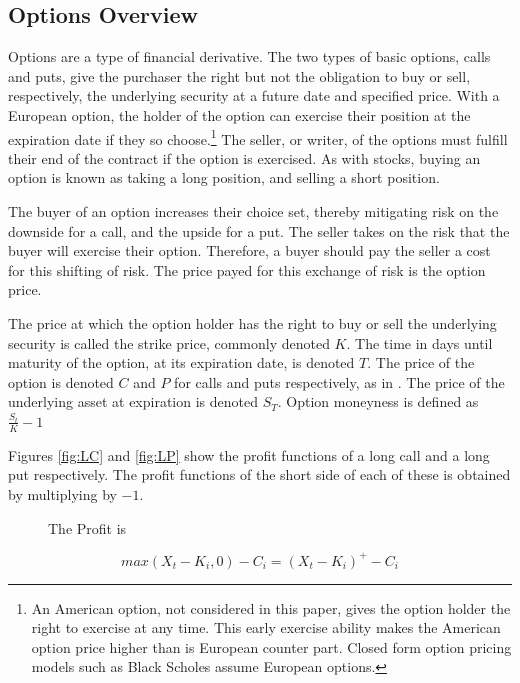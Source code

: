 \begin{appendix}
\section{Options Overview}\label{app:Options}

Options are a type of financial derivative. The two types of basic options, calls and puts, give the purchaser the right but not the obligation to buy or sell, respectively, the underlying security at a future date and specified price. With a European option, the holder of the option can exercise their position at the expiration date if they so choose.\footnote{An American option, not considered in this paper, gives the option holder the right to exercise at any time. This early exercise ability makes the American option price higher than is European counter part. Closed form option pricing models such as Black Scholes assume European options.} The seller, or writer, of the options must fulfill their end of the contract if the option is exercised. As with stocks, buying an option is known as taking a long position, and selling a short position.

The buyer of an option increases their choice set, thereby mitigating risk on the downside for a call, and the upside for a put. The seller takes on the risk that the buyer will exercise their option. Therefore, a buyer should pay the seller a cost for this shifting of risk. The price payed for this exchange of risk is the option price.

The price at which the option holder has the right to buy or sell the underlying security is called the strike price, commonly denoted $K$. The time in days until maturity of the option, at its expiration date, is denoted $T$. The price of the option is denoted $C$ and $P$ for calls and puts respectively, as in \cite{faias2017optimal}. The price of the underlying asset at expiration is denoted $S_{T}$. Option moneyness is defined as $\frac{S_{t}}{K} - 1$

Figures \ref{fig:LC} and \ref{fig:LP} show the profit functions of a long call and a long put respectively. The profit functions of the short side of each of these is obtained by multiplying by $-1$.

\begin{figure}[!htb]
    \begin{minipage}{0.4\linewidth}
        The Profit is

        \[max(X_{t} - K_{i}, 0) - C_{i} = (X_{t} - K_{i})^{+} - C_{i}\]


\end{minipage}
\end{figure}
\end{appendix}
